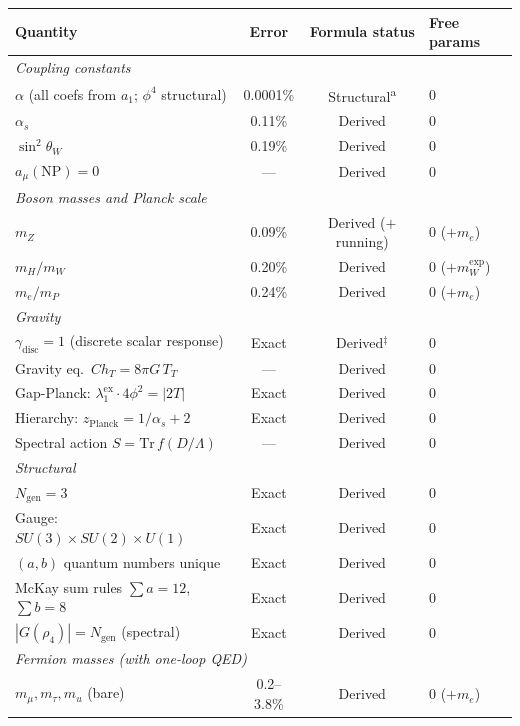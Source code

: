 \documentclass[12pt,a4paper]{article}
\theoremstyle{definition}
\begin{document}
\begin{table}[H]
\centering\footnotesize
\captionsetup{width=\textwidth,singlelinecheck=off}
\begin{tabular}{lccl}
\toprule
\textbf{Quantity} & \textbf{Error} & \textbf{Formula status} & \textbf{Free params} \\
\midrule
\multicolumn{4}{l}{\textit{Coupling constants}} \\
$\alpha$ (all coefs from $a_1$; $\phi^4$ structural) & 0.0001\% & Structural\textsuperscript{a} & 0 \\
$\alpha_s$ & 0.11\% & Derived & 0 \\
$\sin^2\theta_W$ & 0.19\% & Derived & 0 \\
$a_\mu(\text{NP}) = 0$ & --- & Derived & 0 \\
\midrule
\multicolumn{4}{l}{\textit{Boson masses and Planck scale}} \\
$m_Z$ & 0.09\% & Derived ($+$running) & 0 ($+m_e$) \\
$m_H/m_W$ & 0.20\% & Derived & 0 ($+m_W^{\text{exp}}$) \\
$m_e/m_P$ & 0.24\% & Derived & 0 ($+m_e$) \\
\midrule
\multicolumn{4}{l}{\textit{Gravity}} \\
$\gamma_{\text{disc}} = 1$ (discrete scalar response) & Exact & Derived$^\ddagger$ & 0 \\
Gravity eq.\ $C h_T = 8\pi G\, T_T$ & --- & Derived & 0 \\
Gap-Planck: $\lambda_1^{\text{ex}} \cdot 4\phi^2 = |2T|$ & Exact & Derived & 0 \\
Hierarchy: $z_{\text{Planck}} = 1/\alpha_s + 2$ & Exact & Derived & 0 \\
Spectral action $S = \mathrm{Tr}\,f(D/\Lambda)$ & --- & Derived & 0 \\
\midrule
\multicolumn{4}{l}{\textit{Structural}} \\
$N_{\text{gen}} = 3$ & Exact & Derived & 0 \\
Gauge: $SU(3) \times SU(2) \times U(1)$ & Exact & Derived & 0 \\
$(a,b)$ quantum numbers unique & Exact & Derived & 0 \\
McKay sum rules $\sum a = 12$, $\sum b = 8$ & Exact & Derived & 0 \\
$|G(\rho_4)| = N_{\text{gen}}$ (spectral) & Exact & Derived & 0 \\
\midrule
\multicolumn{4}{l}{\textit{Fermion masses (with one-loop QED)}} \\
$m_\mu, m_\tau, m_u$ (bare) & 0.2--3.8\% & Derived & 0 ($+m_e$) \\

\end{tabular}
\end{table}
\end{document}
